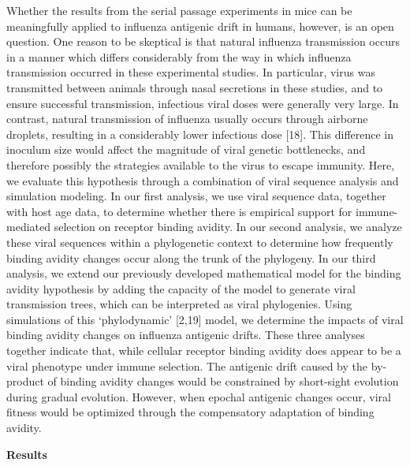 \documentclass[12pt,a4paper]{article}
\begin{document}
Whether the results from the serial passage experiments in mice can be meaningfully applied to influenza antigenic drift in humans, however, is an open question. One reason to be skeptical is that natural influenza transmission occurs in a manner which differs considerably from the way in which influenza transmission occurred in these experimental studies. In particular, virus was transmitted between animals through nasal secretions in these studies, and to ensure successful transmission, infectious viral doses were generally very large. In contrast, natural transmission of influenza usually occurs through airborne droplets, resulting in a considerably lower infectious dose [18]. This difference in inoculum size would affect the magnitude of viral genetic bottlenecks, and therefore possibly the strategies available to the virus to escape immunity. Here, we evaluate this hypothesis through a combination of viral sequence analysis and simulation modeling. In our first analysis, we use viral sequence data, together with host age data, to determine whether there is empirical support for immune-mediated selection on receptor binding avidity. In our second analysis, we analyze these viral sequences within a phylogenetic context to determine how frequently binding avidity changes occur along the trunk of the phylogeny. In our third analysis, we extend our previously developed mathematical model for the binding avidity hypothesis by adding the capacity of the model to generate viral transmission trees, which can be interpreted as viral phylogenies.  Using simulations of this ‘phylodynamic’ [2,19] model, we determine the impacts of viral binding avidity changes on influenza antigenic drifts. These three analyses together indicate that, while cellular receptor binding avidity does appear to be a viral phenotype under immune selection. The antigenic drift caused by the by-product of binding avidity changes would be constrained by short-sight evolution during gradual evolution. However, when epochal antigenic changes occur, viral fitness would be optimized through the compensatory adaptation of binding avidity. 

{\bf Results}

\end{document}
